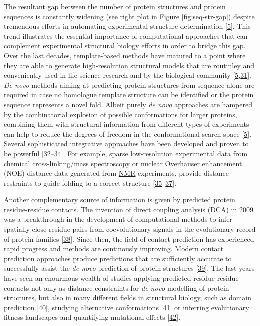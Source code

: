 \documentclass[11pt,a4paper,twoside]{book}
\theoremstyle{definition}
\theoremstyle{definition}
\theoremstyle{remark}
\begin{document}
The resultant gap between the number of protein structures and protein
sequences is constantly widening (see right plot in Figure
\ref{fig:seq-str-gap}) despite tremendous efforts in automating
experimental structure determination
{[}\protect\hyperlink{ref-Schwede2013}{5}{]}. This trend illustrates the
essential importance of computational approaches that can complement
experimental structural biology efforts in order to bridge this gap.
Over the last decades, template-based methods have matured to a point
where they are able to generate high-resolution structural models that
are routinley and conveniently used in life-science research and by the
biological community
{[}\protect\hyperlink{ref-Schwede2013}{5},\protect\hyperlink{ref-BKC2016}{31}{]}.
\emph{De novo} methods aiming at predicting protein structures from
sequence alone are required in case no homologue template structure can
be identified or the protein sequence represents a novel fold. Albeit
purely \emph{de novo} approaches are hampered by the combinatorial
explosion of possible conformations for larger proteins, combining them
with structural information from different types of experiments can help
to reduce the degrees of freedom in the conformational search space
{[}\protect\hyperlink{ref-Schwede2013}{5}{]}. Several sophisticated
integrative approaches have been developed and proven to be powerful
{[}\protect\hyperlink{ref-Ornes2016}{32}--\protect\hyperlink{ref-Tang2015}{34}{]}.
For example, sparse low-resolution experimental data from chemical
cross-linking/mass spectroscopy or nuclear Overhauser enhancement (NOE)
distance data generated from \protect\hyperlink{abbrev}{NMR}
experiments, provide distance restraints to guide folding to a correct
structure
{[}\protect\hyperlink{ref-Li2004}{35}--\protect\hyperlink{ref-Rappsilber2011}{37}{]}.

Another complementary source of information is given by predicted
protein residue-residue contacts. The invention of direct coupling
analysis (\protect\hyperlink{abbrev}{DCA}) in 2009 was a breakthrough in
the development of computational methods to infer spatially close
residue pairs from coevolutionary signals in the evolutionary record of
protein families {[}\protect\hyperlink{ref-Weigt2009}{38}{]}. Since
then, the field of contact prediction has experienced rapid progress and
methods are continously improving. Modern contact prediction approaches
produce predictions that are sufficiently accurate to successfully
assist the \emph{de novo} prediction of protein structures
{[}\protect\hyperlink{ref-Marks2011}{39}{]}. The last years have seen an
enourmous wealth of studies applying predicted residue-residue contacts
not only as distance constraints for \emph{de novo} modelling of protein
structures, but also in many different fields in structural biology,
such as domain prediction
{[}\protect\hyperlink{ref-Sadowski2013}{40}{]}, studying alternative
conformations {[}\protect\hyperlink{ref-Parisi2015a}{41}{]} or inferring
evolutionary fitness landscapes and quantifying mutational effects
{[}\protect\hyperlink{ref-Hopf2017}{42}{]}.
\end{document}
